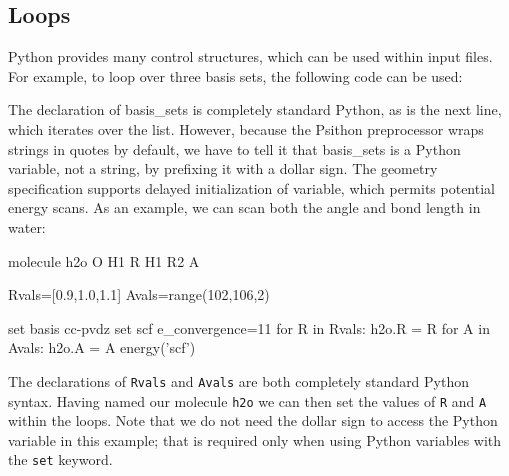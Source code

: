 \subsection{Loops}
Python provides many control structures, which can be used within \PSIfour
input files. For example, to loop over three basis sets, the following code can
be used:
The declaration of basis\_sets is completely standard Python, as is the next
line, which iterates over the list. However, because the Psithon preprocessor
wraps strings in quotes by default, we have to tell it that basis\_sets is a
Python variable, not a string, by prefixing it with a dollar sign. The geometry
specification supports delayed initialization of variable, which permits
potential energy scans. As an example, we can scan both the angle and bond
length in water:
\begin{Snippet}
molecule h2o{
  O
  H1 R
  H1 R2 A
}

Rvals=[0.9,1.0,1.1]
Avals=range(102,106,2)

set basis cc-pvdz
set scf e_convergence=11
for R in Rvals:
    h2o.R = R
    for A in Avals:
        h2o.A = A
        energy('scf')
\end{Snippet}
The declarations of {\tt Rvals} and {\tt Avals} are both completely standard Python syntax.
Having named our molecule {\tt h2o} we can then set the values of {\tt R} and {\tt A} within
the loops. Note that we do not need the dollar sign to access the Python
variable in this example; that is required only when using Python variables
with the {\tt set} keyword.

